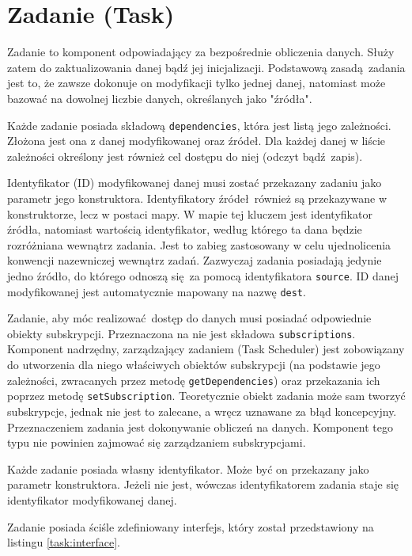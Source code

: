 \section{Zadanie (Task)}
Zadanie to komponent odpowiadający za bezpośrednie obliczenia danych. Służy zatem do zaktualizowania danej bądź jej inicjalizacji. Podstawową zasadą zadania jest to, że zawsze dokonuje on modyfikacji tylko jednej danej, natomiast może bazować na dowolnej liczbie danych, określanych jako "źródła". 

Każde zadanie posiada składową \lstinline$dependencies$, która jest listą jego zależności. Złożona jest ona z danej modyfikowanej oraz źródeł. Dla każdej danej w liście zależności określony jest również cel dostępu do niej (odczyt bądź zapis).

Identyfikator (ID) modyfikowanej danej musi zostać przekazany zadaniu jako parametr jego konstruktora. Identyfikatory źródeł również są przekazywane w konstruktorze, lecz w postaci mapy. W mapie tej kluczem jest identyfikator źródła, natomiast wartością identyfikator, według którego ta dana będzie rozróżniana wewnątrz zadania. Jest to zabieg zastosowany w celu ujednolicenia konwencji nazewniczej wewnątrz zadań. Zazwyczaj zadania posiadają jedynie jedno źródło, do którego odnoszą się za pomocą identyfikatora \lstinline$source$. ID danej modyfikowanej jest automatycznie mapowany na nazwę \lstinline$dest$. 

Zadanie, aby móc realizować dostęp do danych musi posiadać odpowiednie obiekty subskrypcji. Przeznaczona na nie jest składowa \lstinline$subscriptions$. Komponent nadrzędny, zarządzający zadaniem (Task Scheduler) jest zobowiązany do utworzenia dla niego właściwych obiektów subskrypcji (na podstawie jego zależności, zwracanych przez metodę \lstinline$getDependencies$) oraz przekazania ich poprzez metodę \lstinline$setSubscription$. Teoretycznie obiekt zadania może sam tworzyć subskrypcje, jednak nie jest to zalecane, a wręcz uznawane za błąd koncepcyjny. Przeznaczeniem zadania jest dokonywanie obliczeń na danych. Komponent tego typu nie powinien zajmować się zarządzaniem subskrypcjami.

Każde zadanie posiada własny identyfikator. Może być on przekazany jako parametr konstruktora. Jeżeli nie jest, wówczas identyfikatorem zadania staje się identyfikator modyfikowanej danej.

Zadanie posiada ściśle zdefiniowany interfejs, który został przedstawiony na listingu \ref{task:interface}.


